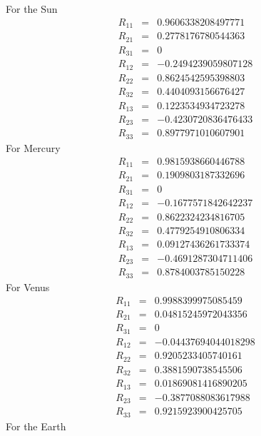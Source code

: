 {\noindent For the Sun
%
\begin{eqnarray}
   R_{11} & = &  0.9606338208497771 \nonumber \\
   R_{21} & = &  0.2778176780544363 \nonumber \\
   R_{31} & = &  0 \nonumber \\
   R_{12} & = &  -0.2494239059807128 \nonumber \\
   R_{22} & = &  0.8624542595398803 \nonumber \\
   R_{32} & = &  0.4404093156676427 \nonumber \\
   R_{13} & = &  0.1223534934723278 \nonumber \\
   R_{23} & = &  -0.4230720836476433 \nonumber \\
   R_{33} & = &  0.8977971010607901
\end{eqnarray}
%
For Mercury
%
\begin{eqnarray}
   R_{11} & = &  0.9815938660446788 \nonumber \\
   R_{21} & = &  0.1909803187332696 \nonumber \\
   R_{31} & = &  0 \nonumber \\
   R_{12} & = &  -0.1677571842642237 \nonumber \\
   R_{22} & = &  0.8622324234816705 \nonumber \\
   R_{32} & = &  0.4779254910806334 \nonumber \\
   R_{13} & = &  0.09127436261733374 \nonumber \\
   R_{23} & = &  -0.4691287304711406 \nonumber \\
   R_{33} & = &  0.8784003785150228
\end{eqnarray}
%
For Venus
%
 \begin{eqnarray}
   R_{11} & = &  0.9988399975085459 \nonumber \\
   R_{21} & = &  0.04815245972043356 \nonumber \\
   R_{31} & = &  0 \nonumber \\
   R_{12} & = &  -0.04437694044018298 \nonumber \\
   R_{22} & = &  0.9205233405740161 \nonumber \\
   R_{32} & = &  0.3881590738545506 \nonumber \\
   R_{13} & = &  0.01869081416890205 \nonumber \\
   R_{23} & = &  -0.3877088083617988 \nonumber \\
   R_{33} & = &  0.9215923900425705
\end{eqnarray}
%
For the Earth
}
